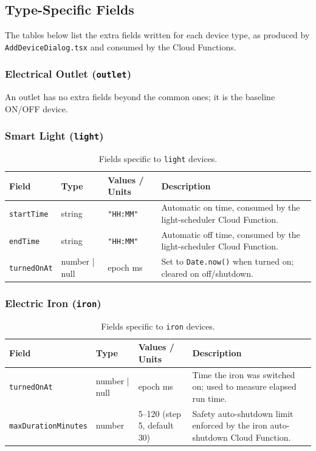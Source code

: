 \documentclass[11pt,a4paper]{article}
\begin{document}
\subsection{Type-Specific Fields}
\label{sub:typefields}

The tables below list the extra fields written for each device type, as produced by
\texttt{AddDeviceDialog.tsx} and consumed by the Cloud Functions.

\subsubsection{Electrical Outlet (\texttt{outlet})}
An outlet has no extra fields beyond the common ones; it is the baseline ON/OFF device.

\subsubsection{Smart Light (\texttt{light})}
\begin{table}[H]
\centering
\caption{Fields specific to \texttt{light} devices.}
\begin{tabularx}{\textwidth}{@{}l l X X@{}}
\toprule
\textbf{Field} & \textbf{Type} & \textbf{Values / Units} & \textbf{Description} \\
\midrule
\texttt{startTime} & string & \texttt{"HH:MM"} & Automatic on time, consumed by the light-scheduler Cloud Function. \\
\texttt{endTime} & string & \texttt{"HH:MM"} & Automatic off time, consumed by the light-scheduler Cloud Function. \\
\texttt{turnedOnAt} & number | null & epoch ms & Set to \texttt{Date.now()} when turned on; cleared on off/shutdown. \\
\bottomrule
\end{tabularx}
\end{table}

\subsubsection{Electric Iron (\texttt{iron})}
\begin{table}[H]
\centering
\caption{Fields specific to \texttt{iron} devices.}
\begin{tabularx}{\textwidth}{@{}l l X X@{}}
\toprule
\textbf{Field} & \textbf{Type} & \textbf{Values / Units} & \textbf{Description} \\
\midrule
\texttt{turnedOnAt} & number | null & epoch ms & Time the iron was switched on; used to measure elapsed run time. \\
\texttt{maxDurationMinutes} & number & 5--120 (step 5, default 30) & Safety auto-shutdown limit enforced by the iron auto-shutdown Cloud Function. \\
\bottomrule
\end{tabularx}
\end{table}
\end{document}
